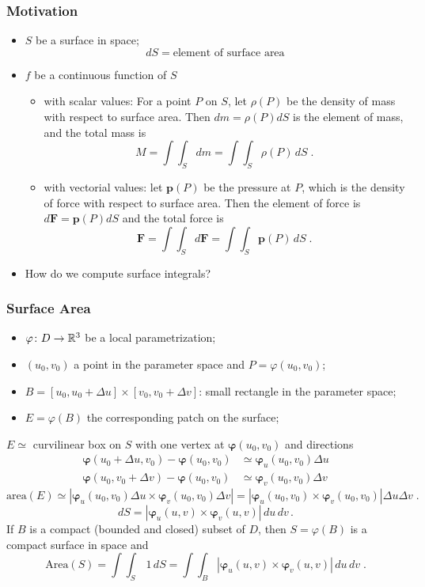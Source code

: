 \begin{frame}
  \frametitle{Motivation}

    \begin{itemize}
      \item $S$ be a surface in space;
      $$dS = \text{element of surface area}$$
      \item \pause $f$ be a continuous function of $S$
      \begin{itemize}
        \item \pause with scalar values: For a point $P$ on $S$, let $\rho(P)$ be the density of mass with respect to surface area. Then $dm = \rho(P) dS$ is the element of mass, and the total mass is
%
$$M = \int\!\!\!\int_S dm = \int\!\!\!\int_S \rho(P) \, dS \; .$$
%
        \item \pause with vectorial values: let $\textbf{p}(P)$ be the pressure at $P$, which is the density of force with respect to surface area. Then the element of force is $d\textbf{F} = \textbf{p}(P) dS$ and the total force is
%
$$\textbf{F} = \int\!\!\!\int_S d\textbf{F} = \int\!\!\!\int_S \textbf{p}(P) \, dS \; .$$
      \end{itemize}
    \item \pause How do we compute surface integrals?
    \end{itemize}
\end{frame}

\begin{frame}
  \frametitle{Surface Area}

\begin{itemize}
  \item $\varphi \colon D \to {\mathbb{R}}^3$ be a local parametrization;
  \item $(u_0,v_0)$ a point in the parameter space and $P = \varphi(u_0,v_0)$;
  \item $B = [u_0,u_0 + \Delta u] \times [v_0,v_0+\Delta v]$: small rectangle in the parameter space;
  \item $E=\varphi(B)$ the corresponding patch on the surface;
\end{itemize}

\pause
$E \simeq$ curvilinear box on $S$ with one vertex at $\bm{\varphi}(u_0,v_0)$ and directions
%
\begin{align*}
  \bm{\varphi}(u_0+\Delta u,v_0) - \bm{\varphi}(u_0,v_0) & \simeq  \bm{\varphi}_u (u_0,v_0) \Delta u \\
  \bm{\varphi}(u_0,v_0+\Delta v) - \bm{\varphi}(u_0,v_0) & \simeq  \bm{\varphi}_v (u_0,v_0) \Delta v
\end{align*}
%
$$\text{area}(E) \simeq |\bm{\varphi}_u(u_0,v_0) \Delta u \times \bm{\varphi}_v(u_0,v_0)\Delta v| = |\bm{\varphi}_u(u_0,v_0) \times \bm{\varphi}_v(u_0,v_0)| \Delta u \Delta v\; .$$
%
$$dS = |\bm{\varphi}_u(u,v) \times \bm{\varphi}_v(u,v)| \, du\, dv\, .$$
%
\pause If $B$ is a compact (bounded and closed) subset of $D$, then $S=\varphi(B)$ is a compact surface in space and
%
$$\text{Area}(S) = \int\!\!\!\int_{S} \, 1\,dS = \int\!\!\!\int_B |\bm{\varphi}_u(u,v) \times \bm{\varphi}_v(u,v)| \, du\, dv\; .$$
%
\end{frame}

